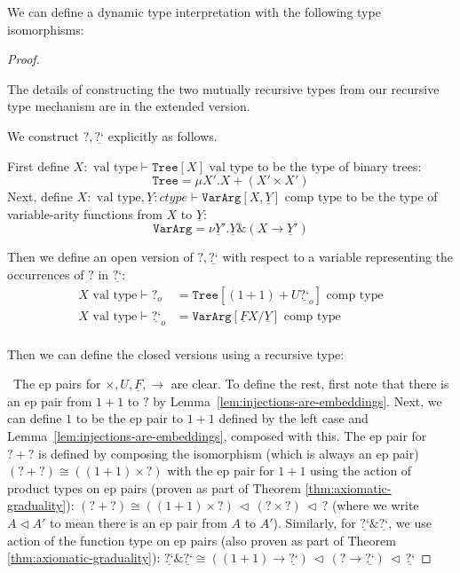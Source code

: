 \documentclass[acmsmall,screen,12pt]{acmart}
\renewcommand{\u}{\underline}
\newcommand{\vtype}{\,\,\text{val type}}
\newcommand{\ctype}{\,\,\text{comp type}}
\newcommand{\dynv}{{?}}
\newcommand{\dync}{\u {\text{?`}}}
\newcommand{\with}{\mathbin{\&}}
\begin{document}
\begin{definition} \label{def:scheme-like-type-interp}
  We can define a dynamic type interpretation with the following type
  isomorphisms:
\end{definition}
\begin{proof}
  \begin{shortonly}
    The details of constructing the two mutually recursive types from
    our recursive type mechanism are in the extended version. 
  \end{shortonly}
  \begin{longonly}
  We construct $\dynv, \dync$ explicitly as follows.

  First define $X : \vtype \vdash \texttt{Tree}[X] \vtype$ to be the
  type of binary trees:
  \[ \texttt{Tree} = \mu X'. X + (X' \times X') \]
  Next, define $X:\vtype, \u Y: ctype \vdash \texttt{VarArg}[X,\u Y]
  \ctype$ to be the type of variable-arity functions from $X$ to $\u
  Y$:
  \[ \texttt{VarArg} = \nu \u Y'. \u Y \with (X \to \u Y') \]

  Then we define an open version of $\dynv, \dync$ with respect to a
  variable representing the occurrences of $\dynv$ in $\dync$:
  \begin{align*}
    X \vtype \vdash \dynv_o &= \texttt{Tree}[(1+1) + U \dync_o] \ctype\\
    X \vtype \vdash \dync_o &= \texttt{VarArg}[\u F X/\u Y] \ctype\\
  \end{align*}

  Then we can define the closed versions using a recursive type:
  \end{longonly}
  \ The ep pairs for $\times, U,\u F, \to$ are clear.  To define the
  rest, first note that there is an ep pair from $1+1$ to $\dynv$ by
  Lemma~\ref{lem:injections-are-embeddings}.  Next, we can define $1$ to
  be the ep pair to $1+1$ defined by the left case and
  Lemma~\ref{lem:injections-are-embeddings}, composed with this.  The ep
  pair for $\dynv + \dynv$ is defined by composing the isomorphism
  (which is always an ep pair)
  $(\dynv + \dynv) \cong ((1+1) \times \dynv)$ with the ep pair for
  $1+1$ using the action of product types on ep pairs (proven as part of
  Theorem \ref{thm:axiomatic-graduality}): $(\dynv + \dynv) \cong
  ((1+1)\times \dynv) \,\triangleleft\, (\dynv \times \dynv) \,\triangleleft\,
  \dynv$ (where we write $A \triangleleft A'$ to mean there is an ep
  pair from $A$ to $A'$).  Similarly, for $\dync \with \dync$, we use
  action of the function type on ep pairs (also proven as part of
  Theorem \ref{thm:axiomatic-graduality}): $\dync \with \dync \cong
  ((1+1) \to \dync) \,\triangleleft\, (\dynv \to \dync) \,\triangleleft\, \dync$
\end{proof}
\end{document}
